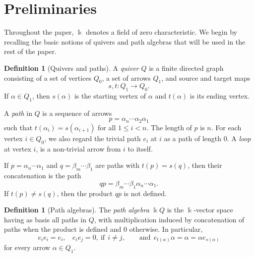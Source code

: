 \documentclass[11pt]{article}
\newcommand{\K}{\Bbbk}
\theoremstyle{plain}
\theoremstyle{definition}
\newtheorem{definition}[theorem]{Definition}
\theoremstyle{remark}
\begin{document}
\section{Preliminaries}


Throughout the paper, \(\K\) denotes a field of zero characteristic.  We begin by recalling the basic
notions of quivers and path algebras that will be used in the rest of the paper.

\begin{definition}[Quivers and paths]
A \emph{quiver} \(Q\) is a finite directed graph consisting of a set of
vertices \(Q_0\), a set of arrows \(Q_1\), and source and target maps
\[
s,t:Q_1\to Q_0.
\]
If \(\alpha\in Q_1\), then \(s(\alpha)\) is the starting vertex of \(\alpha\)
and \(t(\alpha)\) is its ending vertex.

A \emph{path} in \(Q\) is a sequence of arrows
\[
p=\alpha_n\cdots \alpha_2\alpha_1
\]
such that \(t(\alpha_i)=s(\alpha_{i+1})\) for all \(1\le i<n\).  The length of
\(p\) is \(n\).  For each vertex \(i\in Q_0\), we also regard the trivial path
\(e_i\) at \(i\) as a path of length \(0\). A \emph{loop} at vertex \(i\), is a non-trivial arrow from  \(i\) to itself. 

If \(p=\alpha_n\cdots \alpha_1\) and \(q=\beta_m\cdots \beta_1\) are paths with
\(t(p)=s(q)\), then their concatenation is the path
\[
qp=\beta_m\cdots \beta_1\alpha_n\cdots \alpha_1.
\]
If \(t(p)\ne s(q)\), then the product \(qp\) is not defined.
\end{definition}

\begin{definition}[Path algebras]
 
The \emph{path algebra} \(\K Q\) is the \(\K\)-vector space having as basis all
paths in \(Q\), with multiplication induced by concatenation of paths when the
product is defined and \(0\) otherwise.  In particular,
\[
e_i e_i=e_i, \ \    \ \ e_ie_j=0, \  \text{if} \  \  i\ne j,
\qquad \text{and} \ \ 
e_{t(\alpha)}\alpha=\alpha=\alpha e_{s(\alpha)}
\]
for every arrow \(\alpha\in Q_1\). 


\end{definition}
\end{document}
